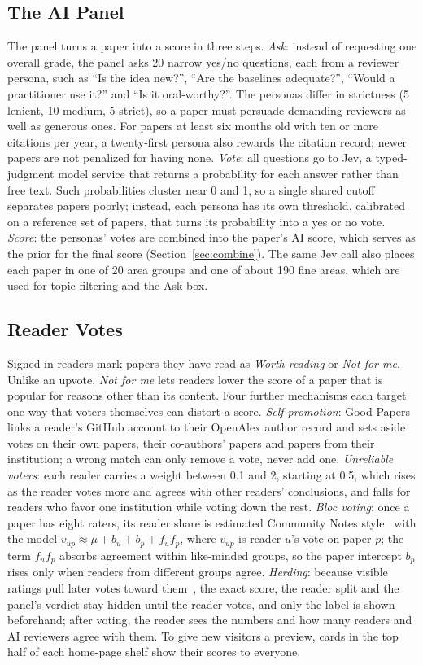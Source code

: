 \documentclass[sigconf]{acmart}
\newcommand{\sys}{Good Papers}
\begin{document}
\subsection{The AI Panel}
The panel turns a paper into a score in three steps.
\emph{Ask}: instead of requesting one overall grade, the panel asks 20 narrow yes/no questions, each from a reviewer persona, such as ``Is the idea new?'', ``Are the baselines adequate?'', ``Would a practitioner use it?'' and ``Is it oral-worthy?''.
The personas differ in strictness (5 lenient, 10 medium, 5 strict), so a paper must persuade demanding reviewers as well as generous ones.
For papers at least six months old with ten or more citations per year, a twenty-first persona also rewards the citation record; newer papers are not penalized for having none.
\emph{Vote}: all questions go to Jev, a typed-judgment model service that returns a probability for each answer rather than free text.
Such probabilities cluster near 0 and 1, so a single shared cutoff separates papers poorly; instead, each persona has its own threshold, calibrated on a reference set of papers, that turns its probability into a yes or no vote.
\emph{Score}: the personas' votes are combined into the paper's AI score, which serves as the prior for the final score (Section~\ref{sec:combine}).
The same Jev call also places each paper in one of 20 area groups and one of about 190 fine areas, which are used for topic filtering and the Ask box.

\subsection{Reader Votes}
Signed-in readers mark papers they have read as \emph{Worth reading} or \emph{Not for me}.
Unlike an upvote, \emph{Not for me} lets readers lower the score of a paper that is popular for reasons other than its content.
Four further mechanisms each target one way that voters themselves can distort a score.
\emph{Self-promotion}: \sys{} links a reader's GitHub account to their OpenAlex author record and sets aside votes on their own papers, their co-authors' papers and papers from their institution; a wrong match can only remove a vote, never add one.
\emph{Unreliable voters}: each reader carries a weight between 0.1 and 2, starting at 0.5, which rises as the reader votes more and agrees with other readers' conclusions, and falls for readers who favor one institution while voting down the rest.
\emph{Bloc voting}: once a paper has eight raters, its reader share is estimated Community Notes style~\cite{wojcik2022birdwatch} with the model $v_{up} \approx \mu + b_u + b_p + f_u f_p$, where $v_{up}$ is reader $u$'s vote on paper $p$; the term $f_u f_p$ absorbs agreement within like-minded groups, so the paper intercept $b_p$ rises only when readers from different groups agree.
\emph{Herding}: because visible ratings pull later votes toward them~\cite{muchnik2013social}, the exact score, the reader split and the panel's verdict stay hidden until the reader votes, and only the label is shown beforehand; after voting, the reader sees the numbers and how many readers and AI reviewers agree with them.
To give new visitors a preview, cards in the top half of each home-page shelf show their scores to everyone.
\end{document}
